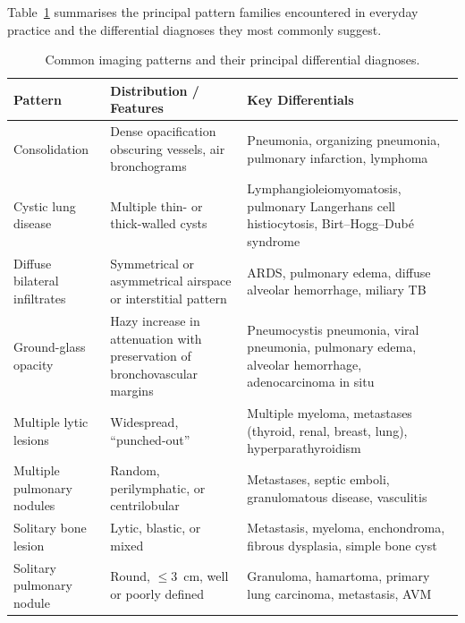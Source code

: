 Table~\ref{tab:pattern_families} summarises the principal pattern families encountered in everyday practice and the differential diagnoses they most commonly suggest.

\begin{table}[h]
\centering
\caption{Common imaging patterns and their principal differential diagnoses.}
\label{tab:pattern_families}
\begin{tabular}{p{3.2cm} p{4cm} p{5.5cm}}
\toprule
\textbf{Pattern} & \textbf{Distribution / Features} & \textbf{Key Differentials} \\
\midrule
Consolidation & Dense opacification obscuring vessels, air bronchograms & Pneumonia, organizing pneumonia, pulmonary infarction, lymphoma \\
Cystic lung disease & Multiple thin- or thick-walled cysts & Lymphangioleiomyomatosis, pulmonary Langerhans cell histiocytosis, Birt--Hogg--Dub\'{e} syndrome \\
Diffuse bilateral infiltrates & Symmetrical or asymmetrical airspace or interstitial pattern & ARDS, pulmonary edema, diffuse alveolar hemorrhage, miliary TB \\
Ground-glass opacity & Hazy increase in attenuation with preservation of bronchovascular margins & Pneumocystis pneumonia, viral pneumonia, pulmonary edema, alveolar hemorrhage, adenocarcinoma in situ \\
Multiple lytic lesions & Widespread, ``punched-out'' & Multiple myeloma, metastases (thyroid, renal, breast, lung), hyperparathyroidism \\
Multiple pulmonary nodules & Random, perilymphatic, or centrilobular & Metastases, septic emboli, granulomatous disease, vasculitis \\
Solitary bone lesion & Lytic, blastic, or mixed & Metastasis, myeloma, enchondroma, fibrous dysplasia, simple bone cyst \\
Solitary pulmonary nodule & Round, $\leq 3$~cm, well or poorly defined & Granuloma, hamartoma, primary lung carcinoma, metastasis, AVM \\
\bottomrule
\end{tabular}
\end{table}

